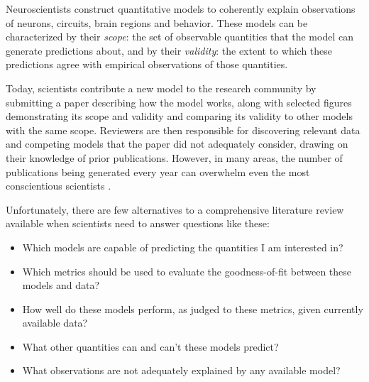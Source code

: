 \documentclass[9pt]{sig-alternate}
\begin{document}
Neuroscientists construct quantitative models to coherently explain observations of neurons, circuits, brain regions and behavior. 
These models can be characterized by their \textit{scope}: the set of observable quantities that the model can generate predictions about, and by their \textit{validity}: the extent to which these predictions agree with empirical observations of those quantities.

Today, scientists contribute a new model to the research community by submitting a paper describing how the model works, along with selected figures demonstrating its scope and validity and comparing its validity to other models with the same scope. 
Reviewers are then responsible for discovering relevant data and competing models that the paper did not adequately consider, drawing on their knowledge of prior publications. 
However, in many areas, the number of publications being generated every year can overwhelm even the most conscientious scientists \cite{jinha_article_2010}. 


Unfortunately, there are few alternatives to a comprehensive literature review available when scientists need to answer questions like these:
\begin{itemize}
\item Which models are capable of predicting the quantities I am interested in?
\item Which metrics should be used to evaluate the goodness-of-fit between these models and  data?
\item How well do these models perform, as judged to these metrics, given currently available data?
\item What other quantities can and can't these models predict?
\item What observations are not adequately explained by any available model?
\end{itemize}


\end{document}

